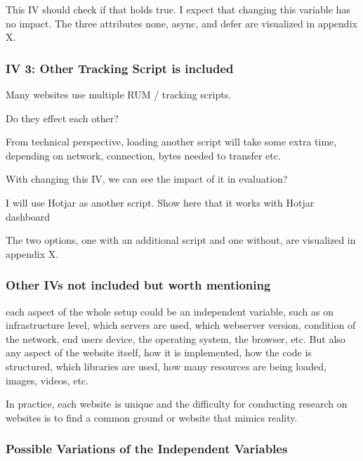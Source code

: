 This IV should check if that holds true.
I expect that changing this variable has no impact.
The three attributes none, async, and defer are visualized in appendix X.


\subsubsection{IV 3: Other Tracking Script is included}

Many websites use multiple RUM / tracking scripts.

Do they effect each other?

From technical perspective, loading another script will take some extra time, depending on network, connection, bytes needed to transfer etc.

With changing this IV, we can see the impact of it in evaluation?

I will use Hotjar as another script.
Show here that it works with Hotjar dashboard

The two options, one with an additional script and one without, are visualized in appendix X.


\subsubsection{Other IVs not included but worth mentioning}

each aspect of the whole setup could be an independent variable, such as on infrastructure level, which servers are used, which webserver version, condition of the network, end users device, the operating system, the browser, etc.
But also any aspect of the website itself, how it is implemented, how the code is structured, which libraries are used, how many resources are being loaded, images, videos, etc.

In practice, each website is unique and the difficulty for conducting research on websites is to find a common ground or website that mimics reality.



\subsubsection{Possible Variations of the Independent Variables}

